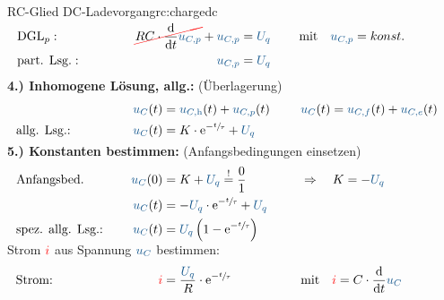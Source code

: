 {\begin{bsp}{RC-Glied DC-Ladevorgang}{rc:chargedc}
\begin{align*}
            &\text{DGL}_{p}:&&&
                \redcancel{RC \cdot \frac{\mathrm{d}}{\mathrm{d}t} \ecv{u_{C,p}}} + \ecv{u_{C,p}} &= \ecv{U_q} &&&
                    &\text{mit}\quad \ecv{u_{C,p}} = konst.  \\
            &\text{part. Lsg.}:&&&
                \ecv{u_{C,p}} &= \ecv{U_q}
                \\[-15pt]&\hphantom{R1ooooooo}&&&\hphantom{L3oooooooooooooooooooo}&\hphantom{R3ooo}&&&&\hphantom{R5oooooooooooooooooooooo}\nonumber%
            \end{align*}%
        \textbf{4.) Inhomogene Lösung, allg.:} (Überlagerung)%
        \begin{align*}%
            &&&&
                \ecv{u_C}(t) &= \ecv{u_{C,\mathrm{h}}}(t) + \ecv{u_{C,p}}(t) &&&
                &\ecv{u_C}(t)= \ecv{u_{C,f}}(t) + \ecv{u_{C,e}}(t)  \\
            &\text{allg. Lsg.:}&&&
                \ecv{u_C}(t) &= K \cdot \mathrm{e}^{-\sfrac{t}{\tau}} + \ecv{U_q}
            \\[-15pt]&\hphantom{R1oooooooooooo}&&&\hphantom{L3ooo}&\hphantom{R3oooooooooooooooo}&&&&\hphantom{R5oooooooooooooooooooooo}\nonumber%
        \end{align*}%
        \textbf{5.) Konstanten bestimmen:} (Anfangsbedingungen einsetzen)%
        \begin{align*}%
            &\text{Anfangsbed.}&&&
                \ecv{u_C}(0) &= K + \ecv{U_q} \overset{!}{=} \frac{0}{1} &&&
                &\Rightarrow\quad K = -\ecv{U_q} \\
            &&&&
                \ecv{u_C}(t) &= -\ecv{U_q} \cdot \mathrm{e}^{-\sfrac{t}{\tau}} + \ecv{U_q} \\
            &\text{spez. allg. Lsg.:}&&&
                \ecv{u_C}(t) &= \ecv{U_q} \left( 1 - \mathrm{e}^{-\sfrac{t}{\tau}} \right)
            \\[-15pt]&\hphantom{R1oooooooooooo}&&&\hphantom{L3ooo}&\hphantom{R3oooooooooooooooo}&&&&\hphantom{R5oooooooooooooooooooooo}\nonumber%
            \end{align*}%
        Strom ${\color{red}i}$ aus Spannung $\ecv{u_C}$ bestimmen:%
        \begin{align*}%
            &\text{Strom:}&&&
                \eci{i} &= \frac{\ecv{U_q}}{R} \cdot \mathrm{e}^{-\sfrac{t}{\tau}} &&&
                &\text{mit}\quad \eci{i} = C \cdot \frac{\mathrm{d}}{\mathrm{d}t} \ecv{u_C}
            \\[-15pt]&\hphantom{R1oooooooooooo}&&&\hphantom{L3ooo}&\hphantom{R3oooooooooooooooo}&&&&\hphantom{R5oooooooooooooooooooooo}\nonumber%
        \end{align*}
        \endgroup
    \end{bsp}
}%

